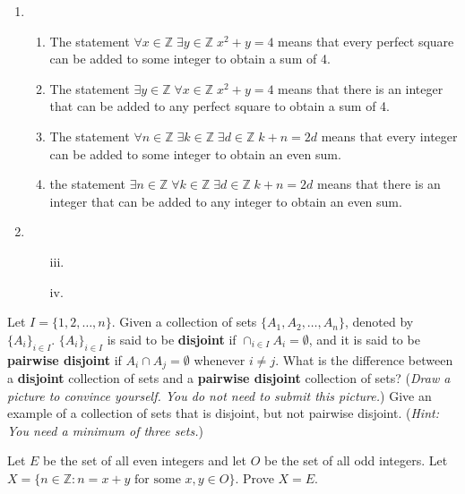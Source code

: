 \documentclass{article}
\newcommand{\Z}{\mathbb{Z}}
\theoremstyle{definition}
\begin{document}
\begin{solution}
\begin{enumerate}
    \item\begin{enumerate}
        \item The statement $\forall x\in\Z\;\exists y\in\Z\;x^2+y=4$ means that every perfect square can be added to some integer to obtain a sum of 4.
        \item The statement $\exists y\in\Z\;\forall x\in\Z\;x^2+y=4$ means that there is an integer that can be added to any perfect square to obtain a sum of 4.
        \item The statement $\forall n\in\Z\;\exists k\in\Z\;\exists d\in\Z\;k+n=2d$ means that every integer can be added to some integer to obtain an even sum.
        \item the statement $\exists n\in\Z\;\forall k\in\Z\;\exists d\in\Z\;k+n=2d$ means that there is an integer that can be added to any integer to obtain an even sum.
    \end{enumerate}
    \item\begin{enumerate}
        \item[iii.]
        \item[iv.]
    \end{enumerate}
\end{enumerate}
\end{solution}
\begin{question}
   Let $I=\{1, 2, \dots, n\}$. Given a collection of sets $\{A_1,A_2,\dots, A_n\}$, denoted by $\{A_i\}_{i\in I}$. $\{A_i\}_{i\in I}$ is said to be \textbf{disjoint} if $\cap_{i\in I}A_i=\emptyset$, and it is said to be \textbf{pairwise disjoint} if $A_i\cap A_j=\emptyset$ whenever $i\neq j$. What is the difference between a \textbf{disjoint} collection of sets and a \textbf{pairwise disjoint} collection of sets? (\textit{Draw a picture to convince yourself. You do not need to submit this picture.}) Give an example of a collection of sets that is disjoint, but not pairwise disjoint. (\textit{Hint: You need a minimum of three sets.})
\end{question}
\begin{solution}
\end{solution}
\begin{question}
   Let $E$ be the set of all even integers and let $O$ be the set of all odd integers. Let $X=\{ n\in \Z : n = x+y \text{ for some } x, y\in O\}$. Prove $X=E$.
\end{question}
\begin{solution}
\end{solution}
\end{document}
